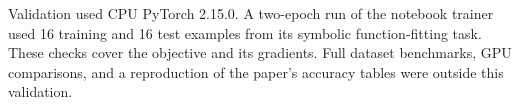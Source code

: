 \documentclass[11pt]{article}
\begin{document}
Validation used CPU PyTorch 2.15.0. A two-epoch run of the notebook trainer used 16 training and 16 test examples from its symbolic function-fitting task. These checks cover the objective and its gradients. Full dataset benchmarks, GPU comparisons, and a reproduction of the paper's accuracy tables were outside this validation.
\end{document}
